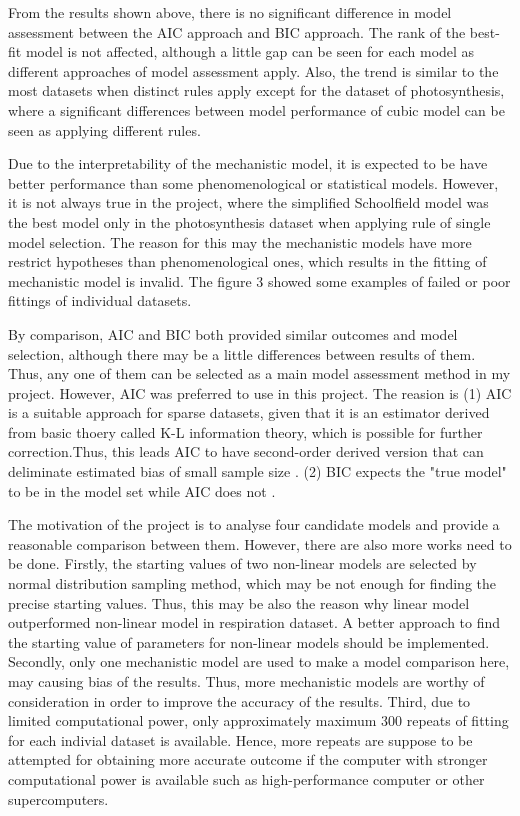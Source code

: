 \documentclass[11pt]{article}
\begin{document}
  From the results shown above, there is no significant difference in model assessment between the AIC approach and BIC approach. The rank of the best-fit model is not affected, although a little gap can be seen for each model as different approaches of model assessment apply.  Also, the trend is similar to the most datasets when distinct rules apply except for the dataset of photosynthesis, where a significant differences between model performance of cubic model can be seen as applying different rules.

  Due to the interpretability of the mechanistic model, it is expected to be have better performance than some phenomenological or statistical models. However, it is not always true in the project, where the simplified Schoolfield model was the best model only in the photosynthesis dataset when applying rule of single model selection. The reason for this may the mechanistic models have more restrict hypotheses than phenomenological ones, which results in the fitting of mechanistic model is invalid. The figure 3 showed some examples of failed or poor fittings of individual datasets. 

  By comparison, AIC and BIC both provided similar outcomes and model selection, although there may be a little differences between results of them. Thus, any one of them can be selected as a main model assessment method in my project. However, AIC was preferred to use in this project. The reasion is (1) AIC is a suitable approach for sparse datasets, given that it is an estimator derived from basic thoery called K-L information theory, which is possible for further correction.Thus, this leads AIC to have second-order derived version that can deliminate estimated bias of small sample size \cite{burnham_anderson_2004}. (2) BIC expects the "true model" to be in the model set while AIC does not \cite{johnson_2004}.

  The motivation of the project is to analyse four candidate models and provide a reasonable comparison between them. However, there are also more works need to be done. Firstly, the starting values of two non-linear models are selected by normal distribution sampling method, which may be not enough for finding the precise starting values. Thus, this may be also the reason why linear model outperformed non-linear model in respiration dataset. A better approach to find the starting value of parameters for non-linear models should be implemented. Secondly, only one mechanistic model are used to make a model comparison here, may causing bias of the results. Thus, more mechanistic models are worthy of consideration in order to improve the accuracy of the results. Third, due to limited computational power, only approximately maximum 300 repeats of fitting for each indivial dataset is available. Hence, more repeats are suppose to be attempted for obtaining more accurate outcome if the computer with stronger computational power is available such as high-performance computer or other supercomputers.
\end{document}
